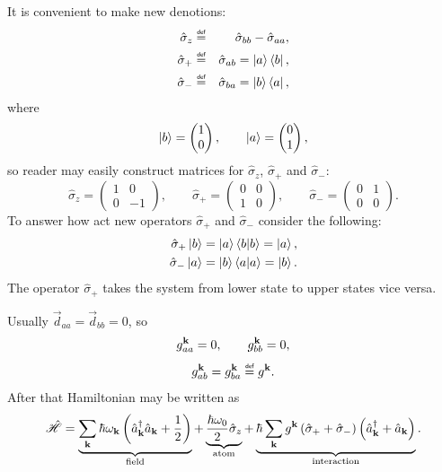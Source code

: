 It is convenient to make new denotions:
\begin{eqnarray}
	\hat{\sigma}_{z} &\myeq& \hat{\sigma}_{bb} - \hat{\sigma}_{aa}, \\
	\hat{\sigma}_{+} &\myeq& \hat{\sigma}_{ab} = \ket{a} \bra{b}, \\
	\hat{\sigma}_{-} &\myeq& \hat{\sigma}_{ba} = \ket{b} \bra{a},
\end{eqnarray}
where
\begin{equation}
	\left\lvert {b} \right\rangle = \begin{pmatrix}
		1 \\ 0
	\end{pmatrix}, \qquad
	\left\lvert {a} \right\rangle = \begin{pmatrix}
	0 \\ 1
	\end{pmatrix},
\end{equation}
so reader may easily construct matrices for $\hat{\sigma}_{z}$, $\hat{\sigma}_{+}$ and $\hat{\sigma}_{-}$:
\begin{equation}
	\hat{\sigma}_z = \begin{pmatrix}
	1 & 0 \\ 0 & -1
	\end{pmatrix}, \qquad
	\hat{\sigma}_+ = \begin{pmatrix}
	0 & 0 \\ 1 & 0
	\end{pmatrix}, \qquad
	\hat{\sigma}_- = \begin{pmatrix}
	0 & 1 \\ 0 & 0
	\end{pmatrix}.
\end{equation}
To answer how act new operators $\hat{\sigma}_{+}$ and $\hat{\sigma}_{-}$ consider the following:
\begin{eqnarray}
	\hat{\sigma}_{+} \left\lvert {b} \right\rangle = \left\lvert {a} \right\rangle \langle {b} \lvert {b} \rangle = \left\lvert {a} \right\rangle, \\
	\hat{\sigma}_{-} \left\lvert {a} \right\rangle = \left\lvert {b} \right\rangle \langle {a} \lvert {a} \rangle = \left\lvert {b} \right\rangle.
\end{eqnarray}
The operator $\hat{\sigma}_{+}$ takes the system from lower state to upper states vice versa.

Usually $\vec{d}_{aa} = \vec{d}_{bb} = 0$, so
\begin{equation}
	g^{\mathbf{k}}_{aa} = 0, \qquad g^{\mathbf{k}}_{bb} = 0,
\end{equation}
\begin{equation}
	g^{\kv}_{ab} = g^{\kv}_{ba} \myeq g^{\kv}.
\end{equation}
After that Hamiltonian may be written as 
\begin{equation}
	\hat{\mathscr{H}} = \underbrace{\sum_{\mathbf{k}} \hbar \omega_{\mathbf{k}} \left( \hat{a}_{\mathbf{k}}^{\dagger}\hat{a}_{\mathbf{k}} + \frac{1}{2} \right)}_{\text{field}} + \underbrace{\frac{\hbar \omega_0}{2} \hat{\sigma}_z}_{\text{atom}} + \underbrace{\hbar \sum_{\mathbf{k}} g^{\mathbf{k}} \left( \hat{\sigma}_+ + \hat{\sigma}_- \right) \left( \hat{a}^{\dagger}_{\mathbf{k}} + \hat{a}_{\mathbf{k}} \right)}_{\text{interaction}}.
\end{equation}

